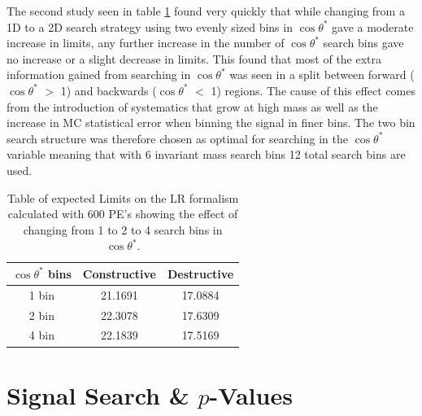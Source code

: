     The second study seen in table \ref{tab:limits_fourbin} found very quickly that while changing from a 1D to a 2D search strategy using two evenly sized bins in $\cos{\theta^{*}}$ gave a moderate increase in limits, any further increase in the number of $\cos{\theta^{*}}$ search bins gave no increase or a slight decrease in limits. This found that most of the extra information gained from searching in $\cos{\theta^{*}}$ was seen in a split between forward ($\cos{\theta^{*}}$ $>$ 1) and backwards ($\cos{\theta^{*}}$ $<$ 1) regions. The cause of this effect comes from the introduction of systematics that grow at high mass as well as the increase in MC statistical error when binning the signal in finer bins. 
    The two bin search structure was therefore chosen as optimal for searching in the $\cos{\theta^{*}}$ variable meaning that with 6 invariant mass search bins 12 total search bins are used. 

 
    \begin {table}[h]
        \begin{center}
        \begin{tabular}{ | c | c | c | } 
            \hline
            \hline
            $\cos{\theta^{*}}$ bins & Constructive & Destructive \\
            \hline
            1 bin & 21.1691 & 17.0884 \\
            2 bin & 22.3078 & 17.6309 \\
            4 bin & 22.1839 & 17.5169 \\
            \hline
            \hline
        \end{tabular}
        \caption{Table of expected Limits on the LR formalism calculated with 600 PE's showing the effect of changing from 1 to 2 to 4 search bins in $\cos{\theta^{*}}$.}
        \label{tab:limits_fourbin}
        \end{center}
    \end {table}


\section{Signal Search \& $p$-Values}

